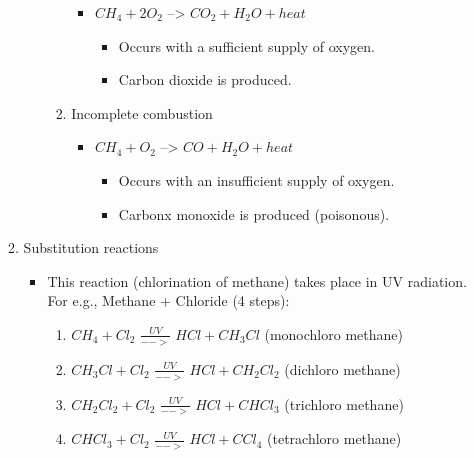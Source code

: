 \documentclass[11pt]{article}
\begin{document}
\begin{enumerate}
\begin{enumerate}
\begin{itemize}
\begin{enumerate}
\begin{itemize}
\item \(CH_4 + 2O_2\) --> \(CO_2 + H_2O + heat\)
\begin{itemize}
\item Occurs with a sufficient supply of oxygen.
\item Carbon dioxide is produced.
\end{itemize}
\end{itemize}
\item Incomplete combustion
\begin{itemize}
\item \(CH_4 + O_2\) --> \(CO + H_2O + heat\)
\begin{itemize}
\item Occurs with an insufficient supply of oxygen.
\item Carbonx monoxide is produced (poisonous).
\end{itemize}
\end{itemize}
\end{enumerate}
\end{itemize}
\item Substitution reactions
\begin{itemize}
\item This reaction (chlorination of methane) takes place in UV radiation. For e.g., Methane + Chloride (4 steps):
\begin{enumerate}
\item \(CH_4 + Cl_2\)  \(\frac{UV}{-->}\)  \(HCl + CH_3Cl\) (monochloro methane)
\item \(CH_3Cl + Cl_2\)  \(\frac{UV}{-->}\)  \(HCl + CH_2Cl_2\) (dichloro methane)
\item \(CH_2Cl_2 + Cl_2\)  \(\frac{UV}{-->}\)  \(HCl + CHCl_3\) (trichloro methane)
\item \(CHCl_3 + Cl_2\)  \(\frac{UV}{-->}\)  \(HCl + CCl_4\) (tetrachloro methane)
\end{enumerate}
\end{itemize}
\end{enumerate}
\end{enumerate}
\end{document}
